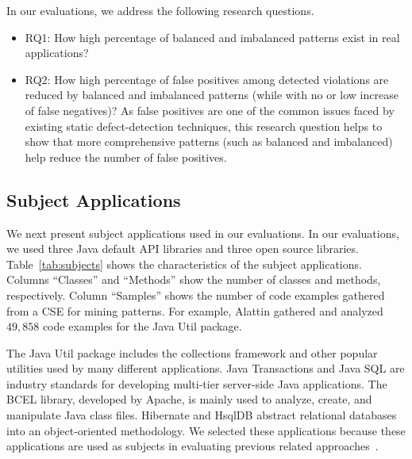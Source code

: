 In our evaluations, we address the following research questions.

\begin{itemize}
\item RQ1: How high percentage of balanced and imbalanced patterns exist in real applications? 
\item RQ2: How high percentage of false positives among detected violations are reduced by balanced and imbalanced patterns (while with no or low increase of false negatives)? As false positives are one of the common issues faced by existing static defect-detection techniques, this research question helps to show that more comprehensive patterns (such as balanced and imbalanced) help reduce the number of false positives. 
\end{itemize}
\subsection{Subject Applications}
\label{sec:subjects}

We next present subject applications used in our evaluations. In our evaluations, we used three Java default API libraries and three open source libraries. Table~\ref{tab:subjects} shows the characteristics of the subject applications. Columns ``Classes'' and ``Methods'' show the number of classes and methods, respectively. Column ``Samples'' shows the number of code examples gathered from a CSE for mining patterns. For example, Alattin gathered and analyzed $49,858$ code examples for the Java Util package.

The Java Util package includes the collections framework and other popular utilities used by many different applications. Java Transactions and Java SQL are industry standards for developing multi-tier server-side Java applications. The BCEL library, developed by Apache, is mainly used to analyze, create, and manipulate Java class files. Hibernate and HsqlDB abstract relational databases into an object-oriented methodology. We selected these applications because these applications are used as subjects in evaluating previous related approaches~\cite{WeimerN05, thummalapenta09:mining}.

